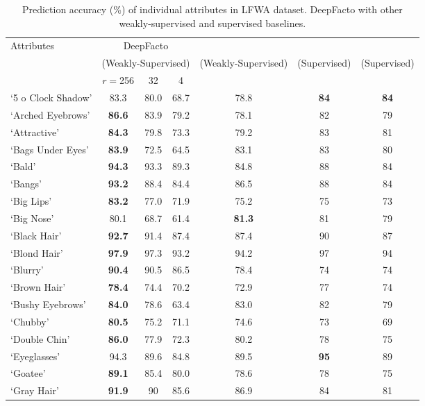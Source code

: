 \begin{table*}[htb]
\caption{Prediction accuracy (\%) of individual attributes in LFWA dataset. DeepFacto with other weakly-supervised and supervised baselines.}
\label{table:attr_lfw}
\vskip 0.15in
\begin{center}
\begin{small}
\begin{sc}
\begin{tabular}{lcccccc}
\toprule
{Attributes} & \multicolumn{3}{c}{\small DeepFacto} & \small \cite{liu2015deep} & \small \cite{liu2018exploring} & \small \cite{zhang2014panda}\\
 {} & \multicolumn{3}{c}{\tiny (Weakly-Supervised)} & {\tiny (Weakly-Supervised)} & {\tiny (Supervised)} & {\tiny (Supervised)} \\
 {} & $r= $256 & 32 & 4 \\
\midrule
‘5 o Clock Shadow’ & 83.3 & 80.0 & 68.7 & 78.8 & \bf84 & \bf84\\
‘Arched Eyebrows’ & \bf86.6 & 83.9 & 79.2 & 78.1 & 82 & 79\\
‘Attractive’ & \bf84.3 & 79.8 & 73.3 & 79.2 & 83 & 81\\
‘Bags Under Eyes’ & \bf83.9 & 72.5 & 64.5 & 83.1 & 83 & 80 \\
‘Bald’ & \bf94.3 & 93.3 & 89.3 & 84.8 & 88 & 84\\
‘Bangs’ & \bf93.2 & 88.4 & 84.4 & 86.5 & 88 & 84\\
‘Big Lips’ & \bf83.2 & 77.0 & 71.9 & 75.2 & 75 & 73\\
‘Big Nose' & 80.1 & 68.7 & 61.4 & \bf81.3 & 81 & 79\\
‘Black Hair’ & \bf92.7 & 91.4 & 87.4 & 87.4 & 90 & 87\\
‘Blond Hair’ & \bf97.9 & 97.3 & 93.2 & 94.2 & 97 & 94\\
‘Blurry’ & \bf90.4 & 90.5 & 86.5 & 78.4 & 74 & 74\\
‘Brown Hair’ & \bf78.4 & 74.4 & 70.2 & 72.9 & 77 & 74\\
‘Bushy Eyebrows’ & \bf84.0 & 78.6 & 63.4 & 83.0 & 82 & 79\\
‘Chubby’ & \bf80.5 & 75.2 & 71.1 & 74.6 & 73 & 69\\
‘Double Chin’ & \bf86.0 & 77.9 & 72.3 & 80.2 & 78 & 75\\
‘Eyeglasses’ & 94.3 & 89.6 & 84.8 & 89.5 & \bf95 & 89\\
‘Goatee’ & \bf89.1 & 85.4 & 80.0 & 78.6 & 78 & 75\\
‘Gray Hair’ & \bf91.9 & 90 & 85.6 & 86.9 & 84 & 81\\

\end{tabular}
\end{sc}
\end{small}
\end{center}
\end{table*}
